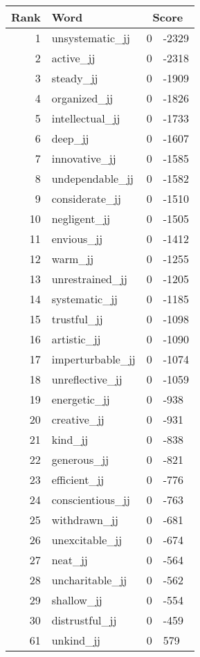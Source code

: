 \begin{longtable}[!htbp]{| rlr@{.}l |}
    \hline
    \textbf{Rank} & \textbf{Word} & \multicolumn{2}{c|}{\textbf{Score}} \\
    \hline
    \endhead
    1 & unsystematic\_jj & 0 & -2329 \\
    2 & active\_jj & 0 & -2318 \\
    3 & steady\_jj & 0 & -1909 \\
    4 & organized\_jj & 0 & -1826 \\
    5 & intellectual\_jj & 0 & -1733 \\
    6 & deep\_jj & 0 & -1607 \\
    7 & innovative\_jj & 0 & -1585 \\
    8 & undependable\_jj & 0 & -1582 \\
    9 & considerate\_jj & 0 & -1510 \\
    10 & negligent\_jj & 0 & -1505 \\
    11 & envious\_jj & 0 & -1412 \\
    12 & warm\_jj & 0 & -1255 \\
    13 & unrestrained\_jj & 0 & -1205 \\
    14 & systematic\_jj & 0 & -1185 \\
    15 & trustful\_jj & 0 & -1098 \\
    16 & artistic\_jj & 0 & -1090 \\
    17 & imperturbable\_jj & 0 & -1074 \\
    18 & unreflective\_jj & 0 & -1059 \\
    19 & energetic\_jj & 0 & -938 \\
    20 & creative\_jj & 0 & -931 \\
    21 & kind\_jj & 0 & -838 \\
    22 & generous\_jj & 0 & -821 \\
    23 & efficient\_jj & 0 & -776 \\
    24 & conscientious\_jj & 0 & -763 \\
    25 & withdrawn\_jj & 0 & -681 \\
    26 & unexcitable\_jj & 0 & -674 \\
    27 & neat\_jj & 0 & -564 \\
    28 & uncharitable\_jj & 0 & -562 \\
    29 & shallow\_jj & 0 & -554 \\
    30 & distrustful\_jj & 0 & -459 \\
    61 & unkind\_jj & 0 & 579 \\

\end{longtable}
